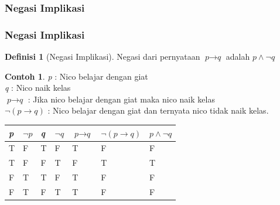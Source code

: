 \documentclass[handout]{beamer}
\theoremstyle{definition}
\newtheorem{definisi}[theorem]{Definisi}
\theoremstyle{example}
\newtheorem{contoh}[theorem]{Contoh}
\begin{document}
\subsubsection{Negasi Implikasi}
\begin{frame}
	\frametitle{Negasi Implikasi}
 \begin{definisi}[Negasi Implikasi]
 	Negasi dari pernyataan $\textit{p}\rightarrow\textit{q}$  adalah $\textit{p}\wedge\neg\textit{q}$    		 	
 \end{definisi}
 \begin{contoh}
 	\textit{p} : Nico belajar dengan giat \\
 	\textit{q} : Nico naik kelas \\
 	$\textit{p}\rightarrow\textit{q}$ : Jika nico belajar dengan giat maka nico naik kelas\\
 	$\neg(\textit{p}\rightarrow\textit{q})$ : Nico belajar dengan giat dan ternyata nico tidak naik kelas.	\\
 	
 	\begin{tabular}{ | l | l | l | l | l | l | l |}
 		\hline
 		\textit{p} & $\neg\textit{p}$ & \textit{q} & $\neg\textit{q}$ & $\textit{p}\rightarrow\textit{q}$ & $\neg(\textit{p}\rightarrow\textit{q})$ & $\textit{p}\wedge\neg\textit{q}$ \\ \hline
 		T & F & T & F & T & F & F\\ \hline
 		T & F & F & T & F & T & T \\ \hline
 		F & T & T & F & T & F & F\\ \hline
 		F & T & F & T & T & F & F\\     		 
 		\hline
 	\end{tabular}
 \end{contoh}
\end{frame}
\end{document}

